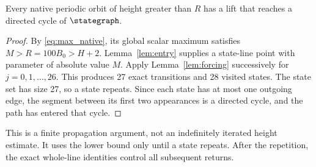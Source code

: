 \begin{proposition}\label{prop:graph_cycle_entry}
Every native periodic orbit of height greater than \(R\) has a lift
that reaches a directed cycle of \(\stategraph\).
\end{proposition}

\begin{proof}
By \eqref{eq:max_native}, its global scalar maximum satisfies
\(M>R=100B_0>H+2\). Lemma~\ref{lem:entry} supplies a state-line
point with parameter of absolute value \(M\). Apply
Lemma~\ref{lem:forcing} successively for \(j=0,1,\ldots,26\).
This produces 27 exact transitions and 28 visited states. The state
set has size 27, so a state repeats. Since each state has at most one
outgoing edge, the segment between its first two appearances is a
directed cycle, and the path has entered that cycle.
\end{proof}

This is a finite propagation argument, not an indefinitely iterated
height estimate. It uses the lower bound only until a state repeats.
After the repetition, the exact whole-line identities control all
subsequent returns.
